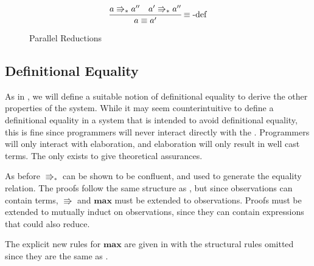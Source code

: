 \begin{figure}

\[
\frac{a\Rrightarrow_{\ast}a''\quad a'\Rrightarrow_{\ast}a''}{a\equiv a'}
\operatorname{\equiv-def}
\]
\caption{\CLang{} Parallel Reductions}
\label{fig:cast-reduction}
\end{figure}
 
\subsection{Definitional Equality}
 
As in , we will define a suitable notion of definitional equality to derive the other properties of the system.
While it may seem counterintuitive to define a definitional equality in a system that is intended to avoid definitional equality, this is fine since programmers will never interact directly with the \csys.
Programmers will only interact with elaboration, and elaboration will only result in well cast terms.
The \csys{} only exists to give theoretical assurances.
 
As before $\Rrightarrow_{*}$ can be shown to be confluent, and used to generate the equality relation.
The proofs follow the same structure as , but since observations can contain terms, $\Rrightarrow$ and $\textbf{max}$ must be extended to observations.
Proofs must be extended to mutually induct on observations, since they can contain expressions that could also reduce.
 
The explicit new rules for $\textbf{max}$ are given in  with the structural rules omitted since they are the same as .
 

